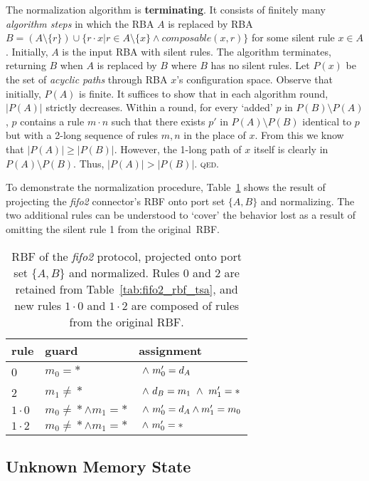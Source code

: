 The normalization algorithm is \textbf{terminating}. It consists of finitely many \textit{algorithm steps} in which the RBA $A$ is replaced by RBA $B=(A \setminus{}\{r\}) \cup{} \{r\cdot{}x | r\in{} A\setminus{}\{x\} \wedge{} composable(x,r)\}$ for some silent rule $x \in{} A$. Initially, $A$ is the input RBA with silent rules. The algorithm terminates, returning $B$ when $A$ is replaced by $B$ where $B$ has no silent rules. Let $P(x)$ be the set of \textit{acyclic paths} through RBA $x$'s configuration space. Observe that initially, $P(A)$ is finite. It suffices to show that in each algorithm round, $|P(A)|$ strictly decreases. Within a round, for every `added' $p$ in $P(B)\setminus{}P(A)$, $p$ contains a rule $m\cdot{}n$ such that there exists $p'$ in $P(A)\setminus{}P(B)$ identical to $p$ but with a 2-long sequence of rules $m, n$ in the place of $x$. From this we know that $|P(A)| \geq |P(B)|$. However, the 1-long path of $x$ itself is clearly in $P(A)\setminus{} P(B)$. Thus, $|P(A)| > |P(B)|$. \textsc{qed}.

To demonstrate the normalization procedure, Table~\ref{tab:fifo2_rbf_tsa_norm} shows the result of projecting the \textit{fifo2} connector's RBF onto port set $\{A,B\}$ and normalizing. The two additional rules can be understood to `cover' the behavior lost as a result of omitting the silent rule 1 from the original~RBF.


\begin{table}
	\centering
	\begin{tabular}{l|ll|}
		rule & guard & assignment \\
		\hline
		0 & $m_0=*$ & $\ \wedge{}\ {}m_0'=d_A$\\
		2 & $m_1\neq{}*$ & $\ \wedge{}\ {}d_B=m_1\ \wedge{}\ {}m_1'=*$ \\
		\hline
		$1\cdot{}0$ & $m_0\neq{}*\wedge{}m_1=*$ & $\ \wedge{}\ {}m_0'=d_A\wedge{}m_1'=m_0$ \\
		$1\cdot{}2$ & $m_0\neq{}*\wedge{}m_1=*$ & $\ \wedge{}\ {}m_0'=*$ \\
		\hline
	\end{tabular}
	\caption[RBF of fifo2 connector, projected and normalized.]{RBF of the \textit{fifo2} protocol, projected onto port set $\{A,B\}$ and normalized. Rules 0 and 2 are retained from Table~\ref{tab:fifo2_rbf_tsa}, and new rules $1\cdot{}0$ and $1\cdot{}2$ are composed of rules from the original RBF.}
	\label{tab:fifo2_rbf_tsa_norm}
\end{table}


\subsection{Unknown Memory State}

